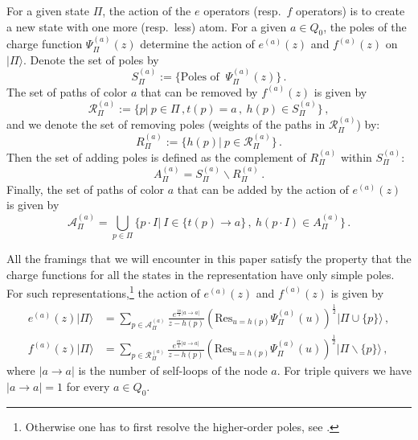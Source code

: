 \documentclass[12pt,a4paper]{article}
\renewcommand{\(}{\left(}
\renewcommand{\)}{\right)}
\renewcommand{\(}{\left(}
\renewcommand{\)}{\right)}
\newcommand{\Res}{\textrm{Res}}
\begin{document}
For a given state $\Pi$, the action of the $e$ operators (resp.\ $f$ operators) is to create a new state with one more (resp.\ less) atom.
For a given $a\in Q_0$, the poles of the charge function $\Psi_{\Pi}^{(a)}(z)$ determine the action of $e^{(a)}(z)$ and $f^{(a)}(z)$ on $|\Pi\rangle$. 
Denote the set of poles by
\begin{equation}
	S^{(a)}_\Pi:=\{\text{Poles of }\ \Psi_{\Pi}^{(a)}(z)\}\,.
\end{equation}
The set of paths of color $a$ that can be  removed by $f^{(a)}(z)$ is given by
\begin{equation}    
	\mathcal{R}^{(a)}_\Pi:=\{p|\ p\in\Pi\,,t(p)=a\,,\ h(p)\in S^{(a)}_\Pi\}\,, 
\end{equation}
and we denote the set of removing poles (weights of the paths in $\mathcal{R}^{(a)}_\Pi$) by:
\begin{equation}
	R^{(a)}_\Pi:=\{h(p)|\ p\in \mathcal{R}^{(a)}_\Pi\}\,.
\end{equation}
Then the set of adding poles is defined as the complement of $R^{(a)}_\Pi$ within $S^{(a)}_\Pi$:
\begin{equation}
	A^{(a)}_\Pi=S^{(a)}_\Pi\backslash R^{(a)}_\Pi\,.
\end{equation}
Finally, the set of paths of color $a$ that can be added by the action of $e^{(a)}(z)$ is given by
\begin{equation}
\mathcal{A}^{(a)}_\Pi=\bigcup_{p\in \Pi}\bigl\{ p\cdot I|\ I\in \{t(p)\to a\}\,,\  h(p\cdot I)\in A^{(a)}_\Pi\bigr\}\,.
\end{equation}


All the framings that we will encounter in this paper satisfy the property  that the charge functions for all the states in the representation have only simple poles.
For such representations,\footnote{Otherwise one has to first resolve the higher-order poles, see \cite[App.~C]{Li:2023zub}.} the action of $e^{(a)}(z)$ and $f^{(a)}(z)$ is given by
\begin{align}
e^{(a)}(z)|\Pi\rangle&=\sum_{p\in \mathcal{A}^{(a)}_\Pi}\frac{e^{\frac{i\pi}{4}|a\to a|}}{z-h(p)}\left(\Res_{u=h(p)}\Psi_{\Pi}^{(a)}(u)\right)^{\frac{1}{2}}|\Pi\cup\{p\}\rangle\,,\label{eq:QY_e_action}\\
	f^{(a)}(z)|\Pi\rangle&=\sum_{p\in \mathcal{R}^{(a)}_\Pi}\frac{e^{\frac{i\pi}{4}|a\to a|}}{z-h(p)}\left(\Res_{u=h(p)}\Psi_{\Pi}^{(a)}(u)\right)^{\frac{1}{2}}|\Pi\backslash\{p\}\rangle\,,\label{eq:QY_f_action}
\end{align}
where $|a\to a|$ is the number of self-loops of the node $a$. 
For triple quivers we have $|a\to a|=1$ for every $a\in Q_0$.
\end{document}
